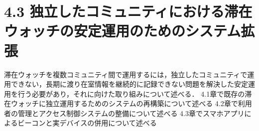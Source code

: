 \chapter{4.3 独立したコミュニティにおける滞在ウォッチの安定運用のためのシステム拡張}

滞在ウォッチを複数コミュニティ間で運用するには，独立したコミュニティで運用できない，長期に渡り在室情報を継続的に記録できない問題を解決した安定運用を行う必要があり，それに向けた取り組みについて述べる．
4.1章で既存の滞在ウォッチに独立運用するためのシステムの再構築について述べる
4.2章で利用者の管理とアクセス制御システムの整備について述べる
4.3章でスマホアプリによるビーコンと実デバイスの併用について述べる










